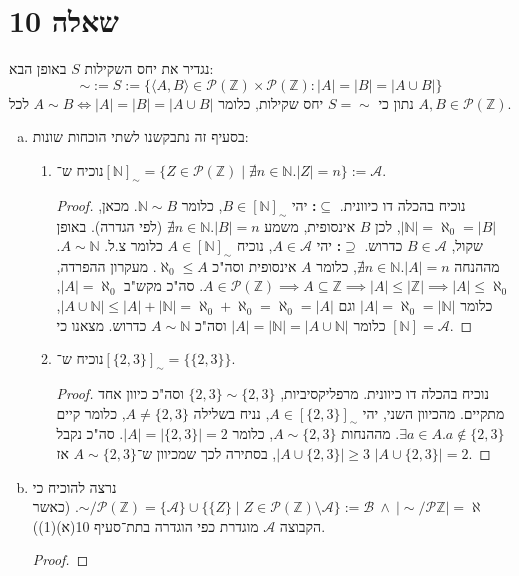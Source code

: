 \documentclass[]{article}
\newcommand\N     {\mathbb{N}}
\newcommand\Z     {\mathbb{Z}}
\newcommand\ps    {\mathcal{P}}
\newcommand\ac    {\mathcal{A}}
\newcommand\bc    {\mathcal{B}}
\newcommand\ra    {\rangle}
\newcommand\la    {\langle}
\newcommand\az    {\aleph_0}
\newcommand\al    {\aleph}
\begin{document}
	\section*{שאלה 10}
	נגדיר את יחס השקילות $ S $ באופן הבא: 
	\[ \sim := S := \{\la A, B \ra \in \ps(\Z) \times \ps(\Z) \colon |A| = |B| = |A \cup B|\} \]
	נתון כי $ S = \sim $ יחס שקילות, כלומר $ A \sim B \iff |A| = |B| = |A \cup B| $ לכל $ A, B \in \ps(\Z) $. 
	\begin{enumerate}[(a)]
		\item בסעיף זה נתבקשנו לשתי הוכחות שונות: 
		\begin{enumerate}[(1)]
			\item נוכיח ש־$ [\N]_\sim = \{Z \in \ps(\Z) \mid \nexists n \in \N. |Z| = n \} := \ac $. \begin{proof}
				נוכיח בהכלה דו כיוונית. $ \bm{\subseteq} $\textbf{: }יהי $ B \in [\N]_\sim $, כלומר $ \N \sim B $. מכאן, $ |\N| = \az = |B| $, לכן $ B $ אינסופית, משמע $ \nexists n \in \N. |B| = n $ (לפי הגדרה). באופן שקול, $ B \in \ac $ כדרוש. $ \bm{\supseteq} $\textbf{: }יהי $ A \in \ac $, נוכיח $ A \in [\N]_\sim $ כלומר צ.ל. $ A \sim \N $. מההנחה $ \nexists n \in \N. |A| = n $, כלומר $ A $ אינסופית וסה"כ $ \az \le A $. מעקרון ההפרדה, $ A \in \ps(\Z) \implies A \subseteq \Z \implies |A| \le |\Z| \implies |A|\le \az $. סה"כ מקש"ב $ |A| = \az $, כלומר $ |A| = \az = |\N| $ וגם $ |A \cup \N| \le |A| + |\N| = \az + \az = \az = |A| $, כלומר $ |A| = |\N| = |A \cup \N| $ וסה"כ $ A \sim \N $ כדרוש. מצאנו כי $ [\N] = \ac $. 
			\end{proof}
		\item נוכיח ש־$ [\{2, 3\}]_\sim = \{\{2, 3\}\} $. \begin{proof}
			נוכיח בהכלה דו כיוונית. מרפליקסיביות, $ \{2, 3\} \sim \{2, 3\} $ וסה"כ כיוון אחד מתקיים. מהכיוון השני, יהי $ A \in [\{2, 3\}]_\sim $, נניח בשלילה $ A \neq \{2, 3\} $, כלומר קיים $ \exists a \in A. a \not \in \{2, 3\} $. מההנחות $ A \sim \{2, 3\} $, כלומר $ |A| = |\{2, 3\}| = 2 $. סה"כ נקבל $ |A \cup \{2, 3\}| \ge 3 $, בסתירה לכך שמכיוון ש־$ A \sim \{2, 3\} $ אז $ |A \cup \{2, 3\}| = 2 $. 
		\end{proof}
		\end{enumerate}
		\item נרצה להוכיח כי $ \sim/\ps(\Z) = \{\ac\} \cup \{\{Z\} \mid Z \in \ps(\Z) \setminus \ac\} := \bc \ \land \ |\sim / \ps\Z| = \al $. (כאשר הקבוצה $ \ac $ מוגדרת כפי הוגדרה בתת־סעיף 10(א)(1)). \begin{proof}

\end{proof}
\end{enumerate}
\end{document}
